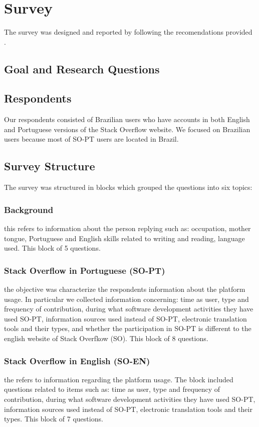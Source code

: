 \section{Survey}
The survey was designed and reported by following the recomendations provided \cite{Kitchenham2002}.
\subsection{Goal and Research Questions}

\subsection{Respondents}
Our respondents consisted of Brazilian users who have accounts in both English and Portuguese versions of the Stack Overflow website. We focused on Brazilian users because most of SO-PT users are located in Brazil.
\subsection{Survey Structure}
The survey was structured in blocks which grouped the questions into six topics:
\subsubsection{Background}  this refers to information about the person replying such as: occupation, mother tongue, Portuguese and English skills related to writing and reading, language used. This block of 5 questions.
\subsubsection{Stack Overflow in Portuguese (SO-PT)} the objective was characterize the respondents information about the platform usage. In particular we collected information concerning: time as user, type and frequency of contribution, during what software development activities they have used SO-PT, information sources used instead of SO-PT, electronic translation tools and their types, and whether the participation in SO-PT is different to the english website of Stack Overfkow (SO). This block of 8 questions.
\subsubsection{Stack Overflow in English (SO-EN)} the refers to information regarding the platform usage. The block included questions related to items such as: time as user, type and frequency of contribution, during what software development activities they have used SO-PT, information sources used instead of SO-PT, electronic translation tools and their types. This block of 7 questions.
